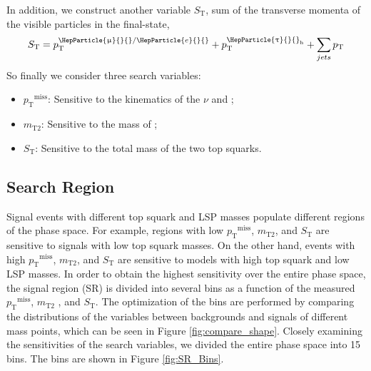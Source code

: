 \documentclass[12pt, a4paper]{article}
\newcommand{\pt}{\ensuremath{p_{\mathrm{T}}}\xspace}
\newcommand{\ptmiss}{\ensuremath{\pt^\text{miss}}}
\newcommand{\mTii}{\ensuremath{m_{\mathrm{T2}}}\xspace}
\newcommand{\ST}{\ensuremath{S_{\mathrm{T}}}\xspace}
\DeclareRobustCommand{\Pe}{{\HepParticle{e}{}{}}\xspace} %
\DeclareRobustCommand{\PGm}{{\HepParticle{\upmu}{}{}}\xspace} %
\DeclareRobustCommand{\PGt}{{\HepParticle{\uptau}{}{}}\xspace} %
\DeclareRobustCommand{\PSGc}{{\HepSusyParticle{\upchi}{}{}}\xspace} %
\DeclareRobustCommand{\PSGczDo}{{\HepParticle{\PSGc}{1}{0}}\xspace}
\DeclareRobustCommand{\PSGcpmDo}{{\HepParticle{\PSGc}{1}{\pm}}\xspace}
\newcommand{\tauh}{\ensuremath{\PGt_\mathrm{h}}\xspace}
\begin{document}
In addition, we construct another variable $\ST$, sum of the transverse momenta of the visible particles in the final-state,
\begin{equation}
\ST= \pt^{\PGm/\Pe}+\pt^{\tauh}+\sum_{jets}\pt
\label{eqn:sT}
\end{equation}
So finally we consider three search variables:
\begin{itemize}
	\item \ptmiss: Sensitive to the kinematics of the $\nu$ and \PSGczDo;
	\item $\mTii$: Sensitive to the mass of \PSGcpmDo;
	\item $\ST$: Sensitive to the total mass of the two top squarks.
\end{itemize}



\subsection{Search Region}
Signal events with different top squark and LSP masses populate different regions of the phase space. For example, regions with low $\ptmiss$, $\mTii$, and $\ST$ are sensitive to signals with low top squark masses. On the other hand, events with high $\ptmiss$, $\mTii$, and $\ST$ are sensitive to models with high top squark and low LSP masses. In order to obtain the highest sensitivity over the entire phase space, the signal region (SR) is divided into several bins as a function of the measured $\ptmiss$, $\mTii$ , and $\ST$. The optimization of the bins are performed by comparing the distributions of the variables between backgrounds and signals of different mass points, which can be seen in Figure \ref{fig:compare_shape}. Closely examining the sensitivities of the search variables, we divided the entire phase space into 15 bins. The bins are shown in Figure \ref{fig:SR_Bins}. 
\end{document}
